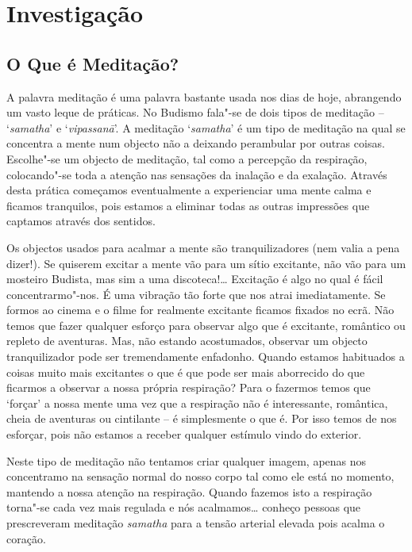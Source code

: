 \part{Investigação}

\chapter{O Que é Meditação?}

A palavra meditação é uma palavra bastante usada nos dias de hoje,
abrangendo um vasto leque de práticas. No Budismo fala"-se de dois tipos
de meditação -- `\emph{samatha}' e `\emph{vipassanā}'. A meditação
`\emph{samatha}' é um tipo de meditação na qual se concentra a mente num
objecto não a deixando perambular por outras coisas. Escolhe"-se um
objecto de meditação, tal como a percepção da respiração, colocando"-se
toda a atenção nas sensações da inalação e da exalação. Através desta
prática começamos eventualmente a experienciar uma mente calma e ficamos
tranquilos, pois estamos a eliminar todas as outras impressões que
captamos através dos sentidos.

Os objectos usados para acalmar a mente são tranquilizadores (nem valia
a pena dizer!). Se quiserem excitar a mente vão para um sítio excitante,
não vão para um mosteiro Budista, mas sim a uma discoteca!\ldots{} Excitação
é algo no qual é fácil concentrarmo"-nos. É uma vibração tão forte que
nos atrai imediatamente. Se formos ao cinema e o filme for realmente
excitante ficamos fixados no ecrã. Não temos que fazer qualquer esforço
para observar algo que é excitante, romântico ou repleto de aventuras.
Mas, não estando acostumados, observar um objecto tranquilizador pode
ser tremendamente enfadonho. Quando estamos habituados a coisas muito
mais excitantes o que é que pode ser mais aborrecido do que ficarmos a
observar a nossa própria respiração? Para o
fazermos temos que `forçar' a nossa mente uma vez que a respiração não é
interessante, romântica, cheia de aventuras ou cintilante -- é
simplesmente o que é. Por isso temos de nos esforçar, pois não estamos a
receber qualquer estímulo vindo do exterior.

Neste tipo de meditação não tentamos criar qualquer imagem, apenas nos
concentramo na sensação normal do nosso corpo tal como ele está no
momento, mantendo a nossa atenção na respiração. Quando fazemos isto a
respiração torna"-se cada vez mais regulada e nós acalmamos\ldots{}
conheço pessoas que prescreveram meditação \emph{samatha} para a tensão
arterial elevada pois acalma o coração.


